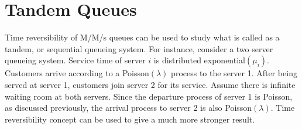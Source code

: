 \documentclass[a4paper,10pt,english]{article}
\begin{document}
\section{Tandem Queues}
Time reversibility of M/M/s queues can be used to study what is called as a tandem, or sequential queueing system. For instance, consider a two server queueing system. Service time of server $i$ is distributed exponential$(\mu_i)$. Customers arrive according to a Poisson$(\lambda)$ process to the server 1. After being served at server 1, customers join server  2 for its service. Assume there is infinite waiting room at both servers. Since the departure process of server 1 is Poisson, as discussed previously, the arrival process to server 2 is also Poisson$(\lambda)$. Time reversibility concept can be used to give a much more stronger result.
\end{document}

